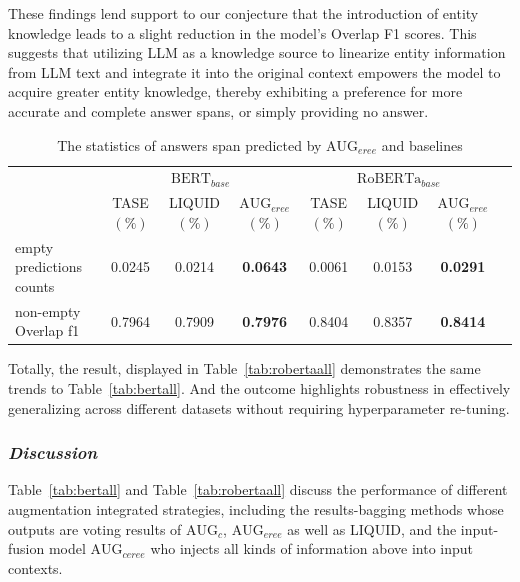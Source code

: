 \documentclass[a4paper,fleqn,twocolumn]{cas-dc}
\newcommand{\1}[1]{\mathds{1}\left[#1\right]}
\begin{document}
	These findings lend support to our conjecture that the introduction of entity knowledge leads to a slight reduction in the model's Overlap F1 scores. This suggests that utilizing LLM as a knowledge source to linearize entity information from LLM text and integrate it into the original context empowers the model to acquire greater entity knowledge, thereby exhibiting a preference for more accurate and complete answer spans, or simply providing no answer.
	
	
	
		\begin{table}[width=\textwidth,cols=9,pos=h]  %
		\caption{The statistics of answers span predicted by $\text{AUG}_{eree}$ and baselines} 
		\label{tab:answer_counts}
		\begin{tabular*}{\textwidth}{@{\extracolsep{\fill}}lccccccc}
			\toprule
			\multirow{2}{*}{\textbf{ }} & \multicolumn{3}{c}{$\text{BERT}_{base}$} & \multicolumn{3}{c}{$\text{RoBERTa}_{base}$}  \\
			\cline{2-7} 
			\addlinespace
			& TASE\((\%)\) & LIQUID\((\%)\) & $\text{AUG}_{eree}$\((\%)\) & TASE\((\%)\) & LIQUID\((\%)\) & $\text{AUG}_{eree}$\((\%)\) \\
			\midrule
			empty predictions counts   & 0.0245 & 0.0214 & \textbf{0.0643} & 0.0061 & 0.0153 & \textbf{0.0291} \\ 
			non-empty Overlap f1  & 0.7964 & 0.7909 & \textbf{0.7976} & 0.8404 & 0.8357 & \textbf{0.8414} \\
			\bottomrule
		\end{tabular*}
		\end{table}
	
	
	
	Totally, the result, displayed in Table~\ref{tab:robertaall} demonstrates the same trends to Table~\ref{tab:bertall}. And the outcome highlights robustness in effectively generalizing across different datasets without requiring hyperparameter re-tuning. 
	
\subsubsection{\textit{Discussion}}
	Table~\ref{tab:bertall} and Table~\ref{tab:robertaall} discuss the performance of different augmentation integrated strategies, including the results-bagging methods whose outputs are voting results of $\text{AUG}_{c}$, $\text{AUG}_{eree}$ as well as LIQUID, and the input-fusion model $\text{AUG}_{ceree}$ who injects all kinds of information above into input contexts.
	
\end{document}
